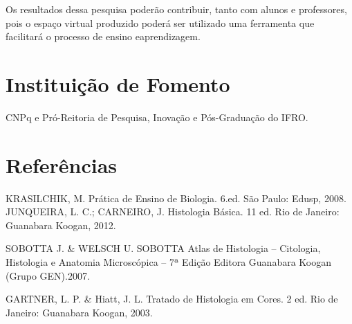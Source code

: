 \documentclass[article,12pt,onesidea,4paper,english,brazil]{abntex2}
\begin{document}
Os resultados dessa pesquisa poderão contribuir, tanto com alunos e professores, pois o espaço virtual produzido poderá ser utilizado uma ferramenta que facilitará o processo de ensino eaprendizagem.
	
	\section*{Instituição de Fomento}
	
	CNPq e Pró-Reitoria de Pesquisa, Inovação e Pós-Graduação do IFRO.
	
	\section*{Referências}
	
\noindent KRASILCHIK, M. Prática de Ensino de Biologia. 6.ed. São Paulo: Edusp, 2008. JUNQUEIRA, L. C.; CARNEIRO, J. Histologia Básica. 11 ed. Rio de Janeiro: Guanabara Koogan, 2012.

\noindent SOBOTTA J. \& WELSCH U. SOBOTTA Atlas de Histologia – Citologia, Histologia e Anatomia Microscópica – 7ª Edição Editora Guanabara Koogan (Grupo GEN).2007.

\noindent GARTNER, L. P. \& Hiatt, J. L. Tratado de Histologia em Cores. 2 ed. Rio de Janeiro: Guanabara Koogan, 2003.
	
\end{document}
